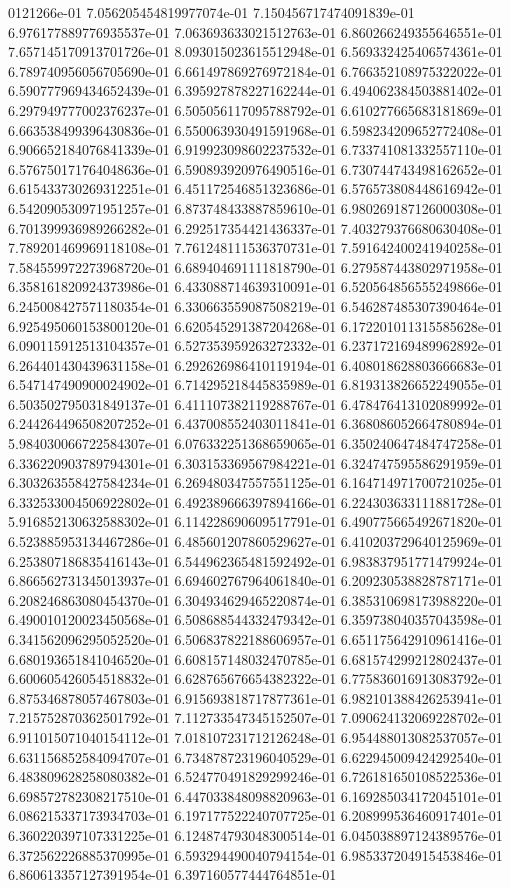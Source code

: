 0121266e-01	7.056205454819977074e-01	7.150456717474091839e-01	6.976177889776935537e-01	7.063693633021512763e-01	6.860266249355646551e-01	7.657145170913701726e-01	8.093015023615512948e-01	6.569332425406574361e-01	6.789740956056705690e-01	6.661497869276972184e-01	6.766352108975322022e-01	6.590777969434652439e-01	6.395927878227162244e-01	6.494062384503881402e-01	6.297949777002376237e-01	6.505056117095788792e-01	6.610277665683181869e-01	6.663538499396430836e-01	6.550063930491591968e-01	6.598234209652772408e-01	6.906652184076841339e-01	6.919923098602237532e-01	6.733741081332557110e-01	6.576750171764048636e-01	6.590893920976490516e-01	6.730744743498162652e-01	6.615433730269312251e-01	6.451172546851323686e-01	6.576573808448616942e-01	6.542090530971951257e-01	6.873748433887859610e-01	6.980269187126000308e-01	6.701399936989266282e-01	6.292517354421436337e-01	7.403279376680630408e-01	7.789201469969118108e-01	7.761248111536370731e-01	7.591642400241940258e-01	7.584559972273968720e-01	6.689404691111818790e-01	6.279587443802971958e-01	6.358161820924373986e-01	6.433088714639310091e-01	6.520564856555249866e-01	6.245008427571180354e-01	6.330663559087508219e-01	6.546287485307390464e-01	6.925495060153800120e-01	6.620545291387204268e-01	6.172201011315585628e-01	6.090115912513104357e-01	6.527353959263272332e-01	6.237172169489962892e-01	6.264401430439631158e-01	6.292626986410119194e-01	6.408018628803666683e-01	6.547147490900024902e-01	6.714295218445835989e-01	6.819313826652249055e-01	6.503502795031849137e-01	6.411107382119288767e-01	6.478476413102089992e-01	6.244264496508207252e-01	6.437008552403011841e-01	6.368086052664780894e-01	5.984030066722584307e-01	6.076332251368659065e-01	6.350240647484747258e-01	6.336220903789794301e-01	6.303153369567984221e-01	6.324747595586291959e-01	6.303263558427584234e-01	6.269480347557551125e-01	6.164714971700721025e-01	6.332533004506922802e-01	6.492389666397894166e-01	6.224303633111881728e-01	5.916852130632588302e-01	6.114228690609517791e-01	6.490775665492671820e-01	6.523885953134467286e-01	6.485601207860529627e-01	6.410203729640125969e-01	6.253807186835416143e-01	6.544962365481592492e-01	6.983837951771479924e-01	6.866562731345013937e-01	6.694602767964061840e-01	6.209230538828787171e-01	6.208246863080454370e-01	6.304934629465220874e-01	6.385310698173988220e-01	6.490010120023450568e-01	6.508688544332479342e-01	6.359738040357043598e-01	6.341562096295052520e-01	6.506837822188606957e-01	6.651175642910961416e-01	6.680193651841046520e-01	6.608157148032470785e-01	6.681574299212802437e-01	6.600605426054518832e-01	6.628765676654382322e-01	6.775836016913083792e-01	6.875346878057467803e-01	6.915693818717877361e-01	6.982101388426253941e-01	7.215752870362501792e-01	7.112733547345152507e-01	7.090624132069228702e-01	6.911015071040154112e-01	7.018107231712126248e-01	6.954488013082537057e-01	6.631156852584094707e-01	6.734878723196040529e-01	6.622945009424292540e-01	6.483809628258080382e-01	6.524770491829299246e-01	6.726181650108522536e-01	6.698572782308217510e-01	6.447033848098820963e-01	6.169285034172045101e-01	6.086215337173934703e-01	6.197177522240707725e-01	6.208999536460917401e-01	6.360220397107331225e-01	6.124874793048300514e-01	6.045038897124389576e-01	6.372562226885370995e-01	6.593294490040794154e-01	6.985337204915453846e-01	6.860613357127391954e-01	6.397160577444764851e-01
